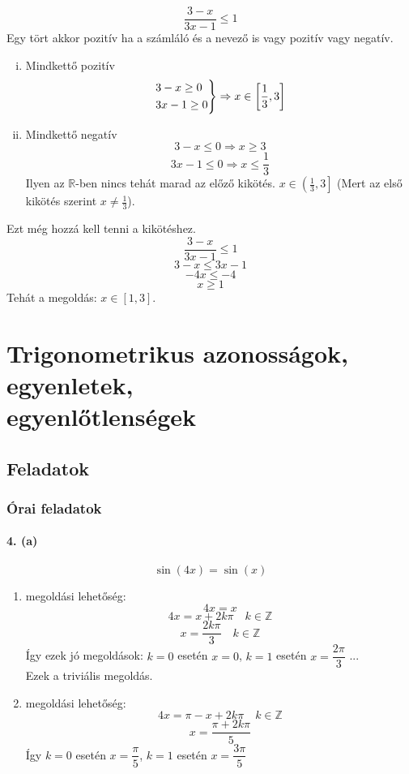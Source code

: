 \documentclass[12pt,a4paper,fleqn]{article}
\newcommand{\myparagraph}[1]{\paragraph{#1}\mbox{}}
\begin{document}
\[ \dfrac{3-x}{3x-1} \leq 1 \]
Egy tört akkor pozitív ha a számláló és a nevező is vagy pozitív vagy negatív.

\indent
\begin{enumerate}[i.] %
  \item Mindkettő pozitív
  \[
  \begin{rcases*}
    3-x \geq 0 \\
    3x -1 \geq 0 \\
  \end{rcases*} \Rightarrow x \in \left[ \frac{1}{3}, 3 \right]
  \]
  \item Mindkettő negatív
  \[ 3-x \leq 0 \Rightarrow x \geq 3 \]
  \[ 3x -1 \leq 0 \Rightarrow x \leq \frac{1}{3} \]
  Ilyen az $\mathbb{R}$-ben nincs tehát marad az előző kikötés.
  $x \in \left( \frac{1}{3}, 3 \right]$ (Mert az első kikötés szerint
  $ x \neq \frac{1}{3}$).
\end{enumerate}
Ezt még hozzá kell tenni a kikötéshez.
\[ \dfrac{3-x}{3x-1} \leq 1 \]
\[ 3-x \leq 3x-1 \]
\[ -4x \leq -4 \]
\[ x \geq 1 \]
Tehát a megoldás: $x \in \left[ 1, 3 \right]$.

\clearpage
\section{Trigonometrikus azonosságok, egyenletek, \\ egyenlőtlenségek}
\setcounter{subsection}{1}
\subsection{Feladatok}
\subsubsection{Órai feladatok}


\myparagraph{4. (a)}
\[ \sin(4x) = \sin(x) \]
\begin{enumerate}
  \item megoldási lehetőség:
  \[ 4x = x \]
  \[ 4x = x + 2k\pi \quad k \in \mathbb{Z} \]
  \[ x = \dfrac{2k\pi}{3} \quad k \in \mathbb{Z} \]
  Így ezek jó megoldások: $k = 0$ esetén $x = 0$, $k = 1$ esetén $x = \dfrac{2\pi}{3}$ ... \\
  Ezek a triviális megoldás.
  \item megoldási lehetőség:
  \[ 4x = \pi - x + 2k\pi \quad k \in \mathbb{Z} \]
  \[ x = \dfrac{\pi + 2k\pi}{5} \]
  Így $k = 0$ esetén $x = \dfrac{\pi}{5}$, $k = 1$ esetén $x = \dfrac{3\pi}{5}$
\end{enumerate}
\end{document}
